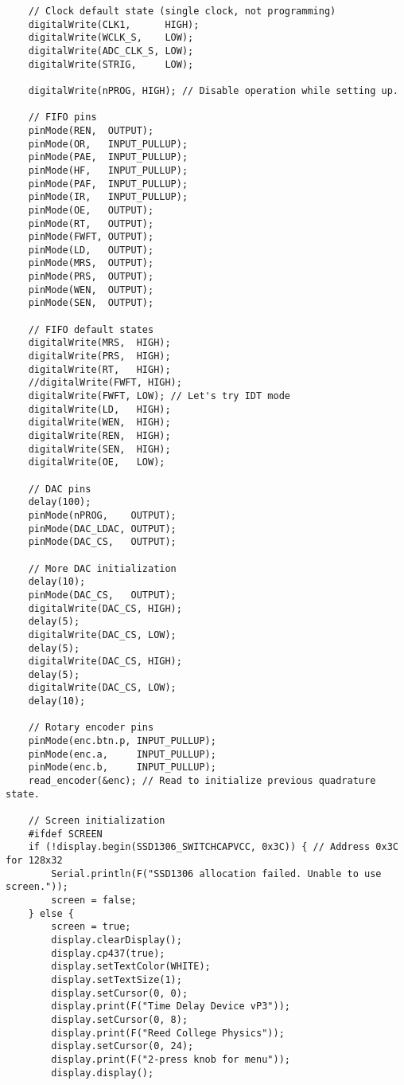 \documentclass[11pt,letterpaper]{article}
\begin{document}
\begin{verbatim}
    // Clock default state (single clock, not programming)
    digitalWrite(CLK1,      HIGH);
    digitalWrite(WCLK_S,    LOW);
    digitalWrite(ADC_CLK_S, LOW);
    digitalWrite(STRIG,     LOW);

    digitalWrite(nPROG, HIGH); // Disable operation while setting up.

    // FIFO pins
    pinMode(REN,  OUTPUT);
    pinMode(OR,   INPUT_PULLUP);
    pinMode(PAE,  INPUT_PULLUP);
    pinMode(HF,   INPUT_PULLUP);
    pinMode(PAF,  INPUT_PULLUP);
    pinMode(IR,   INPUT_PULLUP);
    pinMode(OE,   OUTPUT);
    pinMode(RT,   OUTPUT);
    pinMode(FWFT, OUTPUT);
    pinMode(LD,   OUTPUT);
    pinMode(MRS,  OUTPUT);
    pinMode(PRS,  OUTPUT);
    pinMode(WEN,  OUTPUT);
    pinMode(SEN,  OUTPUT);

    // FIFO default states
    digitalWrite(MRS,  HIGH);
    digitalWrite(PRS,  HIGH);
    digitalWrite(RT,   HIGH);
    //digitalWrite(FWFT, HIGH);
    digitalWrite(FWFT, LOW); // Let's try IDT mode
    digitalWrite(LD,   HIGH);
    digitalWrite(WEN,  HIGH);
    digitalWrite(REN,  HIGH);
    digitalWrite(SEN,  HIGH);
    digitalWrite(OE,   LOW);

    // DAC pins
    delay(100);
    pinMode(nPROG,    OUTPUT);
    pinMode(DAC_LDAC, OUTPUT);
    pinMode(DAC_CS,   OUTPUT);

    // More DAC initialization
    delay(10);
    pinMode(DAC_CS,   OUTPUT);
    digitalWrite(DAC_CS, HIGH);
    delay(5);
    digitalWrite(DAC_CS, LOW);
    delay(5);
    digitalWrite(DAC_CS, HIGH);
    delay(5);
    digitalWrite(DAC_CS, LOW);
    delay(10);

    // Rotary encoder pins
    pinMode(enc.btn.p, INPUT_PULLUP);
    pinMode(enc.a,     INPUT_PULLUP);
    pinMode(enc.b,     INPUT_PULLUP);
    read_encoder(&enc); // Read to initialize previous quadrature state.
    
    // Screen initialization
    #ifdef SCREEN
    if (!display.begin(SSD1306_SWITCHCAPVCC, 0x3C)) { // Address 0x3C for 128x32
        Serial.println(F("SSD1306 allocation failed. Unable to use screen."));
        screen = false;
    } else {
        screen = true;
        display.clearDisplay();
        display.cp437(true);
        display.setTextColor(WHITE);
        display.setTextSize(1);
        display.setCursor(0, 0);
        display.print(F("Time Delay Device vP3"));
        display.setCursor(0, 8);
        display.print(F("Reed College Physics"));
        display.setCursor(0, 24);
        display.print(F("2-press knob for menu"));
        display.display();


\end{verbatim}
\end{document}
